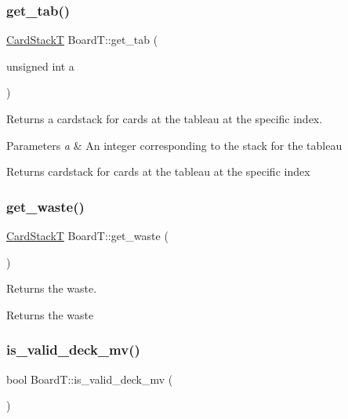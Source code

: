 \subsubsection{\texorpdfstring{get\_tab()}{get\_tab()}}
{\footnotesize\ttfamily \mbox{\hyperlink{_card_stack_8h_a29a6854caf5fec306ee8fc0c6b453837}{Card\+StackT}} Board\+T\+::get\+\_\+tab (\begin{DoxyParamCaption}\item[{unsigned int}]{a }\end{DoxyParamCaption})}



Returns a cardstack for cards at the tableau at the specific index. 


\begin{DoxyParams}{Parameters}
{\em a} & An integer corresponding to the stack for the tableau \\
\hline
\end{DoxyParams}
\begin{DoxyReturn}{Returns}
cardstack for cards at the tableau at the specific index 
\end{DoxyReturn}
\mbox{\label{class_board_t_a1e3a7edd2e993d22a453da1487177585}} 
\subsubsection{\texorpdfstring{get\_waste()}{get\_waste()}}
{\footnotesize\ttfamily \mbox{\hyperlink{_card_stack_8h_a29a6854caf5fec306ee8fc0c6b453837}{Card\+StackT}} Board\+T\+::get\+\_\+waste (\begin{DoxyParamCaption}{ }\end{DoxyParamCaption})}



Returns the waste. 

\begin{DoxyReturn}{Returns}
the waste 
\end{DoxyReturn}
\mbox{\label{class_board_t_affe6cfc5c246bcfa0afd59476c70db8c}} 
\subsubsection{\texorpdfstring{is\_valid\_deck\_mv()}{is\_valid\_deck\_mv()}}
{\footnotesize\ttfamily bool Board\+T\+::is\+\_\+valid\+\_\+deck\+\_\+mv (\begin{DoxyParamCaption}{ }\end{DoxyParamCaption})}



